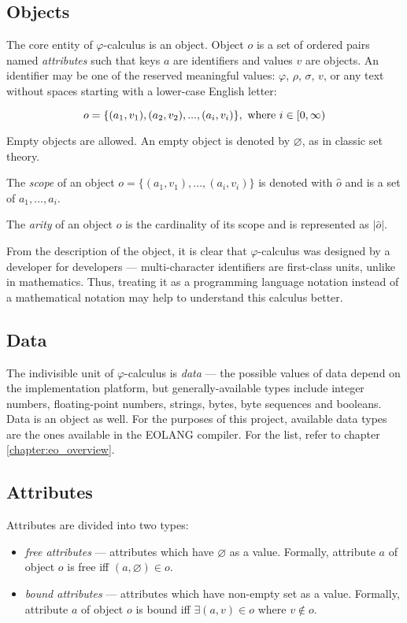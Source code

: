 \subsection{Objects}
The core entity of $\varphi$-calculus is an object. Object $o$ is a set of ordered pairs named \emph{attributes} such that keys $a$ are identifiers and values $v$ are objects. An identifier may be one of the reserved meaningful values: $\varphi$, $\rho$, $\sigma$, $v$, or any text without spaces starting with a lower-case English letter:

\[
    o = \{(a_1, v_1), (a_2, v_2), ..., (a_i, v_i)\}, \textnormal{ where } i \in [0, \infty)
\]

Empty objects are allowed. An empty object is denoted by $\varnothing$, as in classic set theory.

The \emph{scope} of an object $o = \{(a_1, v_1), ..., (a_i, v_i)\}$ is denoted with $\hat{o}$ and is a set of $a_1, ..., a_i$.

The \emph{arity} of an object $o$ is the cardinality of its scope and is represented as $|\hat{o}|$.

From the description of the object, it is clear that $\varphi$-calculus was designed by a developer for developers --- multi-character identifiers are first-class units, unlike in mathematics. Thus, treating it as a programming language notation instead of a mathematical notation may help to understand this calculus better.

\subsection{Data}
The indivisible unit of $\varphi$-calculus is \emph{data} --- the possible values of data depend on the implementation platform, but generally-available types include integer numbers, floating-point numbers, strings, bytes, byte sequences and booleans. Data is an object as well. For the purposes of this project, available data types are the ones available in the EOLANG compiler. For the list, refer to chapter \ref{chapter:eo_overview}.

\subsection{Attributes}
Attributes are divided into two types:

\begin{itemize}
    \item \emph{free attributes} --- attributes which have $\varnothing$ as a value. Formally, attribute $a$ of object $o$ is free iff $(a, \varnothing) \in o$.

    \item \emph{bound attributes} --- attributes which have non-empty set as a value. Formally, attribute $a$ of object $o$ is bound iff $\exists (a, v) \in o$ where $v \notin o$.
\end{itemize}

